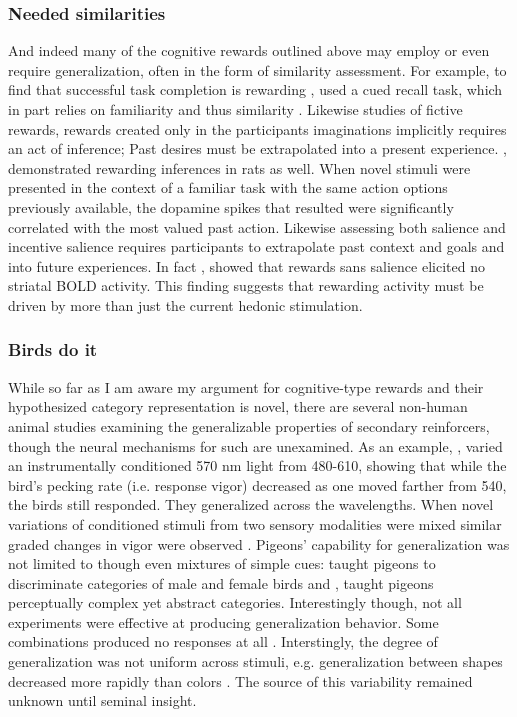 \documentclass[doc,12pt]{apa}        %
\begin{document}
\subsubsection{Needed similarities}
\label{subsub:needed}
And indeed many of the cognitive rewards outlined above may employ or even require generalization, often in the form of similarity assessment.  For example, to find that successful task completion is rewarding , used a cued recall task, which in part relies on familiarity \cite{Jacoby:1991p9096} and thus similarity \cite{Nosofsky:1988p9098}.  Likewise  studies of fictive rewards, rewards created only in the participants imaginations implicitly requires an act of inference; Past desires must be extrapolated into a present experience.  , demonstrated rewarding inferences in rats as well.  When novel stimuli were presented in the context of a familiar task with the same action options previously available, the dopamine spikes that resulted were significantly correlated with the most valued past action.  Likewise assessing both salience and incentive salience requires participants to extrapolate past context and goals and into future experiences.  In fact , showed that rewards sans salience elicited no striatal BOLD activity.  This finding suggests that rewarding activity must be driven by more than just the current hedonic stimulation.

\subsubsection{Birds do it}
\label{subsub:birds}
While so far as I am aware my argument for cognitive-type rewards and their hypothesized category representation is novel, there are several non-human animal studies examining the generalizable properties of secondary reinforcers, though the neural mechanisms for such are unexamined.  As an example, , varied an instrumentally conditioned 570 nm light from 480-610, showing that while the bird's pecking rate (i.e. response vigor) decreased as one moved farther from 540, the birds still responded.  They generalized across the wavelengths.  When novel variations of conditioned stimuli from two sensory modalities were mixed similar graded changes in vigor were observed  \cite{Guttman:1956p8355}.  Pigeons' capability for generalization was not limited to though even mixtures of simple cues: \cite{Nakamura:2006p9093} taught pigeons to discriminate categories of male and female birds and , taught pigeons perceptually complex yet abstract categories.  Interestingly though, not all experiments were effective at producing generalization behavior.  Some combinations produced no responses at all \cite{Blough:2001p8408,Simmons:2008p8405,Urcuioli:2001p8359}.  Interstingly, the degree of generalization was not uniform across stimuli, e.g. generalization between shapes decreased more rapidly than colors .  The source of this variability remained unknown until  seminal insight.
\end{document}
